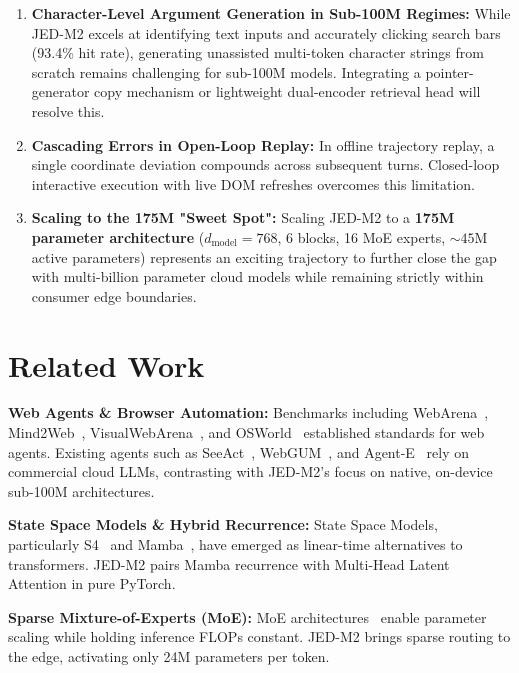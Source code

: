 \documentclass[10pt,twocolumn,letterpaper]{article}
\begin{document}
\begin{enumerate}[leftmargin=*]
    \item \textbf{Character-Level Argument Generation in Sub-100M Regimes:} While JED-M2 excels at identifying text inputs and accurately clicking search bars (93.4\% hit rate), generating unassisted multi-token character strings from scratch remains challenging for sub-100M models. Integrating a pointer-generator copy mechanism or lightweight dual-encoder retrieval head will resolve this.
    \item \textbf{Cascading Errors in Open-Loop Replay:} In offline trajectory replay, a single coordinate deviation compounds across subsequent turns. Closed-loop interactive execution with live DOM refreshes overcomes this limitation.
    \item \textbf{Scaling to the 175M "Sweet Spot":} Scaling JED-M2 to a \textbf{175M parameter architecture} ($d_{\text{model}} = 768$, 6 blocks, 16 MoE experts, $\sim 45\text{M}$ active parameters) represents an exciting trajectory to further close the gap with multi-billion parameter cloud models while remaining strictly within consumer edge boundaries.
\end{enumerate}

\section{Related Work}
\label{sec:related}

\textbf{Web Agents \& Browser Automation:} Benchmarks including WebArena~\cite{zhou2023webarena}, Mind2Web~\cite{deng2023mind2web}, VisualWebArena~\cite{koh2024visualwebarena}, and OSWorld~\cite{xie2024osworld} established standards for web agents. Existing agents such as SeeAct~\cite{zheng2024seeact}, WebGUM~\cite{furuta2024webgum}, and Agent-E~\cite{agente2024} rely on commercial cloud LLMs, contrasting with JED-M2's focus on native, on-device sub-100M architectures.

\textbf{State Space Models \& Hybrid Recurrence:} State Space Models, particularly S4~\cite{gu2021s4} and Mamba~\cite{gu2023mamba, dao2024mamba2}, have emerged as linear-time alternatives to transformers. JED-M2 pairs Mamba recurrence with Multi-Head Latent Attention in pure PyTorch.

\textbf{Sparse Mixture-of-Experts (MoE):} MoE architectures~\cite{shazeer2017outrageously, fedus2022switch, deepseek2024v2} enable parameter scaling while holding inference FLOPs constant. JED-M2 brings sparse routing to the edge, activating only 24M parameters per token.
\end{document}
